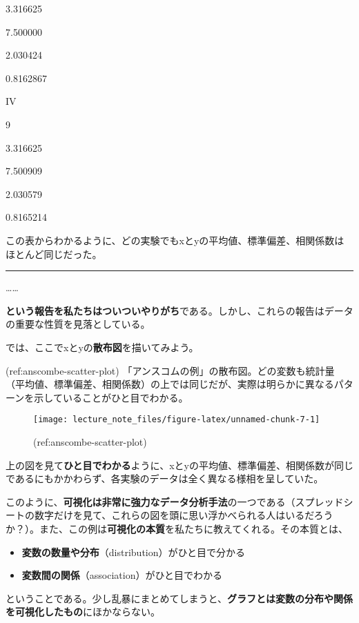\documentclass[]{book}
\begin{document}
3.316625

7.500000

2.030424

0.8162867

IV

9

3.316625

7.500909

2.030579

0.8165214

この表からわかるように、どの実験でもxとyの平均値、標準偏差、相関係数はほとんど同じだった。

\begin{center}\rule{0.5\linewidth}{\linethickness}\end{center}

\ldots{}\ldots{}

\textbf{という報告を私たちはついついやりがち}である。しかし、これらの報告はデータの重要な性質を見落としている。

では、ここでxとyの\textbf{散布図}を描いてみよう。

(ref:anscombe-scatter-plot)
「アンスコムの例」の散布図。どの変数も統計量（平均値、標準偏差、相関係数）の上では同じだが、実際は明らかに異なるパターンを示していることがひと目でわかる。

\begin{figure}

{\centering \texttt{[image: lecture\_note\_files/figure-latex/unnamed-chunk-7-1]} 

}

\caption{(ref:anscombe-scatter-plot)}\label{fig:unnamed-chunk-7}
\end{figure}

上の図を見て\textbf{ひと目でわかる}ように、xとyの平均値、標準偏差、相関係数が同じであるにもかかわらず、各実験のデータは全く異なる様相を呈していた。

このように、\textbf{可視化は非常に強力なデータ分析手法}の一つである（スプレッドシートの数字だけを見て、これらの図を頭に思い浮かべられる人はいるだろうか？）。また、この例は\textbf{可視化の本質}を私たちに教えてくれる。その本質とは、

\begin{itemize}
\item
  \textbf{変数の数量や分布}（distribution）がひと目で分かる
\item
  \textbf{変数間の関係}（association）がひと目でわかる
\end{itemize}

ということである。少し乱暴にまとめてしまうと、\textbf{グラフとは変数の分布や関係を可視化したもの}にほかならない。
\end{document}
